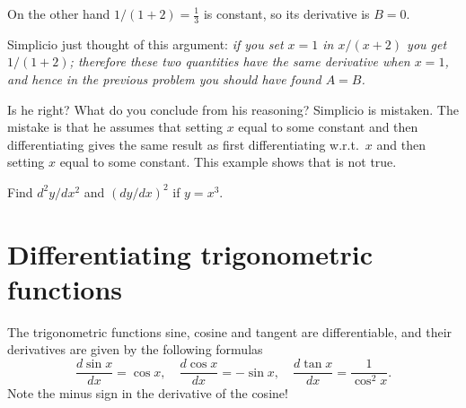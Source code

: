 \begin{multicols}{2}
On the other hand
$1/(1+2) = \frac13$ is constant, so its derivative is $B=0$.
\endanswer




\subprob Simplicio just thought of this argument:
\textit{if you set $x=1$ in $x/(x+2)$ you get
$1/(1+2)$; therefore these two quantities have the same derivative when
$x=1$, and hence in the previous problem you should have found $A=B$. }




Is he right?  What do you conclude from his reasoning?
\answer 
Simplicio is mistaken.  The mistake is that he assumes that setting $x$
equal to some constant and then differentiating gives the same result as first
differentiating w.r.t.~$x$ and then setting $x$ equal to some constant.  This
example shows that is not true.
\endanswer








\problem  \label{ex:d2ydx2dydx2} Find $d^2y/dx^2$ and 
$(dy/dx)^2$ if $y=x^3$.




















\end{multicols}
\noproblemfont
\section{Differentiating trigonometric functions} 
\label{sec:trigDerivatives}
The trigonometric functions sine, cosine and tangent are differentiable, and
their derivatives are given by the following formulas
\begin{equation}
  \frac{d\sin x}{dx} = \cos x,\quad
  \frac{d\cos x}{dx} = -\sin x,\quad
  \frac{d\tan x}{dx} = \frac1{\cos^2 x}.
\end{equation}
Note the minus sign in the derivative of the cosine!





